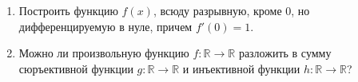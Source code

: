 \documentclass[11pt, a4paper]{article}
\begin{document}
\begin{enumerate}
\item Построить функцию $f(x)$, всюду разрывную, кроме $0$, но дифференцируемую в нуле, причем $f'(0)=1$.

\item Можно ли произвольную функцию $f: \mathbb{R} \rightarrow \mathbb{R}$ разложить в сумму сюръективной функции $g: \mathbb{R} \rightarrow \mathbb{R}$ и инъективной функции $h: \mathbb{R} \rightarrow \mathbb{R}$?

\end{enumerate}
\end{document}
